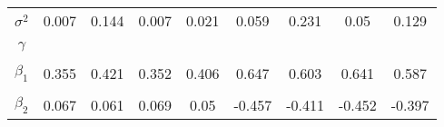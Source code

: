 \begin{footnotesize}
\begin{singlespace}
\begin{tabular}{ccccccccc}
$ \sigma^{2} $ & 0.007 & 0.144 & 0.007 & 0.021 & 0.059 & 0.231 & 0.05 & 0.129 \\ 
 & \begin{tiny} [0.004,0.01] \end{tiny}  & \begin{tiny} [0.117,0.176] \end{tiny}  & \begin{tiny} [0.004,0.01] \end{tiny}  & \begin{tiny} [0.011,0.033] \end{tiny}  & \begin{tiny} [0.037,0.076] \end{tiny}  & \begin{tiny} [0.188,0.274] \end{tiny}  & \begin{tiny} [0.035,0.072] \end{tiny}  & \begin{tiny} [0.097,0.161] \end{tiny}  \\ 
$\gamma$ &  &  &  &  &  &  &  &  \\ 
 &  &  &  &  &  &  &  &  \\ 
$ \beta_{1} $ & 0.355 & 0.421 & 0.352 & 0.406 & 0.647 & 0.603 & 0.641 & 0.587 \\ 
 & \begin{tiny} [0.268,0.443] \end{tiny}  & \begin{tiny} [0.36,0.481] \end{tiny}  & \begin{tiny} [0.264,0.441] \end{tiny}  & \begin{tiny} [0.325,0.485] \end{tiny}  & \begin{tiny} [0.553,0.739] \end{tiny}  & \begin{tiny} [0.536,0.671] \end{tiny}  & \begin{tiny} [0.548,0.733] \end{tiny}  & \begin{tiny} [0.518,0.656] \end{tiny}  \\ 
$ \beta_{2} $ & 0.067 & 0.061 & 0.069 & 0.05 & -0.457 & -0.411 & -0.452 & -0.397 \\ 

\end{tabular}
\end{singlespace}
\end{footnotesize}
